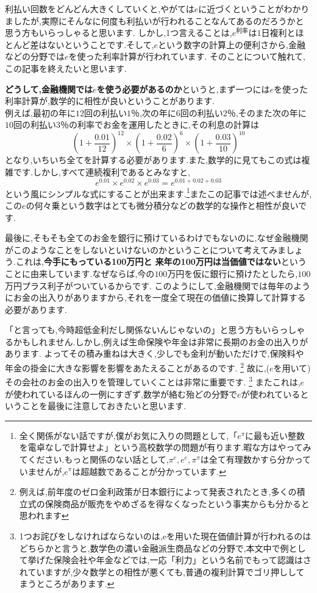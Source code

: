 利払い回数をどんどん大きくしていくと,やがては$e$に近づくということがわかりましたが,実際にそんなに何度も利払いが行われることなんてあるのだろうかと思う方もいらっしゃると思います.
しかし,1つ言えることは,$e^{利率}$は$1$日複利とほとんど差はないということです.そして,$e$という数字の計算上の便利さから,金融などの分野では$e$を使った利率計算が行われています.
そのことについて触れて,この記事を終えたいと思います.\par
{\bf どうして,金融機関では$e$を使う必要があるのか}というと,まず一つには$e$を使った利率計算が,数学的に相性が良いということがあります.\\
例えば,最初の年に$12$回の利払い$1$％,次の年に$6$回の利払い$2$％,そのまた次の年に$10$回の利払い$3$％の利率でお金を運用したときに,その利息の計算は
\[
(1+\frac{0.01}{12})^{12} \times (1+\frac{0.02}{6})^6 \times (1+\frac{0.03}{10})^{10}
\]
となり,いちいち全てを計算する必要があります.また,数学的に見てもこの式は複雑です.しかし,すべて連続複利であるとみなすと,
\[
e^{0.01} \times e^{0.02} \times e^{0.03} = e^{0.01+0.02+0.03}
\]
という風にシンプルな式にすることが出来ます.\footnote{全く関係がない話ですが,僕がお気に入りの問題として,「$e^\pi$に最も近い整数を電卓なしで計算せよ」という高校数学の問題が有ります.暇な方はやってみてください.もっと関係のない話として,$\pi^e,e^e,\pi^\pi$は全て有理数かすら分かっていませんが,$e^\pi$は超越数であることが分かっています.}またこの記事では述べませんが,この$e$の何々乗という数字はとても微分積分などの数学的な操作と相性が良いです.\par
最後に,そもそも全てのお金を銀行に預けているわけでもないのに,なぜ金融機関がこのようなことをしないといけないのかということについて考えてみましょう.これは,{\bf 今手にもっている100万円と 来年の100万円は当価値ではない}ということに由来しています.なぜならば,今の$100$万円を仮に銀行に預けたとしたら,$100$万円プラス利子がついているからです.
このようにして,金融機関では毎年のようにお金の出入りがありますから,それを一度全て現在の価値に換算して計算する必要があります.\par
「と言っても,今時超低金利だし関係ないんじゃないの」と思う方もいらっしゃるかもしれません.しかし,例えば生命保険や年金は非常に長期のお金の出入りがあります.
よってその積み重ねは大きく,少しでも金利が動いただけで,保険料や年金の掛金に大きな影響を影響をあたえることがあるのです.
\footnote{例えば,前年度のゼロ金利政策が日本銀行によって発表されたとき,多くの積立式の保険商品が販売をやめざるを得なくなったという事実からも分かると思われます}
故に,($e$を用いて)その会社のお金の出入りを管理していくことは非常に重要です.
\footnote{1つお詫びをしなければならないのは,eを用いた現在価値計算が行われるのはどちらかと言うと,数学色の濃い金融派生商品などの分野で,本文中で例として挙げた保険会社や年金などでは,一応「利力」という名前でもって認識はされていますが,少々数学との相性が悪くても,普通の複利計算でゴリ押ししてまうところがあります.}
またこれは,$e$が使われているほんの一例にすぎず,数学が絡む殆どの分野で$e$が使われているということを最後に注意しておきたいと思います.

